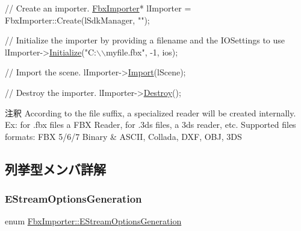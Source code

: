 \begin{DoxyEnumerate}
\begin{DoxyCode}
\textcolor{comment}{// Create an importer.}
\hyperlink{class_fbx_importer}{FbxImporter}* lImporter = FbxImporter::Create(lSdkManager, \textcolor{stringliteral}{""});

\textcolor{comment}{// Initialize the importer by providing a filename and the IOSettings to use}
lImporter->\hyperlink{class_fbx_importer_a70528a9ca1ff737bda9696a2073acd13}{Initialize}(\textcolor{stringliteral}{"C:\(\backslash\)\(\backslash\)myfile.fbx"}, -1, ios);

\textcolor{comment}{// Import the scene.}
lImporter->\hyperlink{class_fbx_importer_a1c5a7f9ee8a6952c1e039065cfa09659}{Import}(lScene); 

\textcolor{comment}{// Destroy the importer.}
lImporter->\hyperlink{class_fbx_object_a7b49e6a0c17132cd7e2e7e8485a08915}{Destroy}(); 
\end{DoxyCode}

\end{DoxyEnumerate}

\begin{DoxyRemark}{注釈}
According to the file suffix, a specialized reader will be created internally. Ex\+: for .fbx files a F\+BX Reader, for .3ds files, a 3ds reader, etc. Supported files formats\+: F\+BX 5/6/7 Binary \& A\+S\+C\+II, Collada, D\+XF, O\+BJ, 3\+DS 
\end{DoxyRemark}


\subsection{列挙型メンバ詳解}
\mbox{\label{class_fbx_importer_a5174c9311e7e1295e7bf3338d209def5}} 
\subsubsection{\texorpdfstring{E\+Stream\+Options\+Generation}{EStreamOptionsGeneration}}
{\footnotesize\ttfamily enum \hyperlink{class_fbx_importer_a5174c9311e7e1295e7bf3338d209def5}{Fbx\+Importer\+::\+E\+Stream\+Options\+Generation}}


